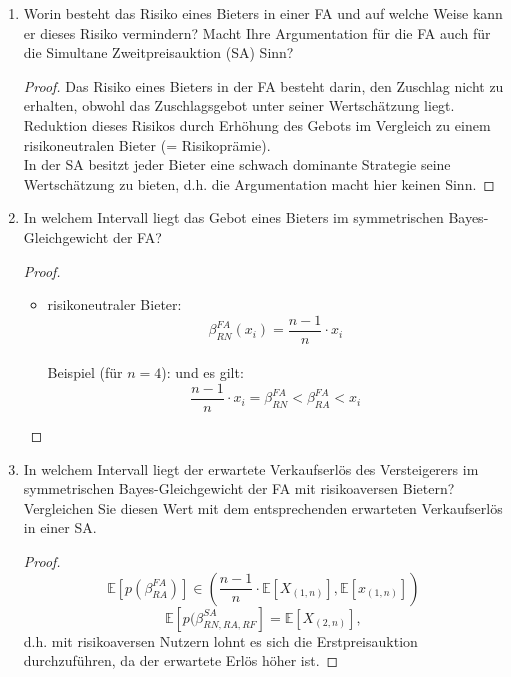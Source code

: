 \documentclass[12pt]{extreport} %
\theoremstyle{named}
\theoremstyle{nnamed}
\theoremstyle{itshape}
\theoremstyle{normal}
\begin{document}
\begin{enumerate}
	\item Worin besteht das Risiko eines Bieters in einer FA und auf welche Weise kann er dieses Risiko vermindern? Macht Ihre Argumentation für die FA auch für die Simultane Zweitpreisauktion (SA) Sinn?
		\begin{proof}
			Das Risiko eines Bieters in der FA besteht darin, den Zuschlag nicht zu erhalten, obwohl das Zuschlagsgebot unter seiner Wertschätzung liegt. Reduktion dieses Risikos durch Erhöhung des Gebots im Vergleich zu einem risikoneutralen Bieter (= Risikoprämie). \\
			
			In der SA besitzt jeder Bieter eine schwach dominante Strategie seine Wertschätzung zu bieten, d.h. die Argumentation macht hier keinen Sinn.
		\end{proof}
	\item In welchem Intervall liegt das Gebot eines Bieters im symmetrischen Bayes-Gleichgewicht der FA?
		\begin{proof} ~\
			\begin{itemize}
				\item risikoneutraler Bieter:
					$$ \beta_{RN}^{FA}(x_{i}) = \frac{n-1}{n} \cdot x_{i} $$ ~\\
					
				Beispiel (für $n = 4$):
    			und es gilt:
    			$$ \frac{n-1}{n} \cdot x_{i} = \beta_{RN}^{FA} < \beta_{RA}^{FA} < x_{i} $$
			\end{itemize}
		\end{proof}
	\item In welchem Intervall liegt der erwartete Verkaufserlös des Versteigerers im symmetrischen Bayes-Gleichgewicht der FA mit risikoaversen Bietern? Vergleichen Sie diesen Wert mit dem entsprechenden erwarteten Verkaufserlös in einer SA.
		\begin{proof}
			$$ \mathbb{E}\left[p\left(\beta_{RA}^{FA}\right)\right] \in \left( \frac{n-1}{n} \cdot \mathbb{E}\left[X_{(1,n)}\right], \mathbb{E}\left[x_{(1,n)}\right] \right) $$
			$$ \mathbb{E}\left[p(\beta^{SA}_{RN,RA,RF}\right] = \mathbb{E}\left[X_{(2,n)} \right], $$
			d.h. mit risikoaversen Nutzern lohnt es sich die Erstpreisauktion durchzuführen, da der erwartete Erlös höher ist.
		\end{proof}
\end{enumerate}
\end{document}
